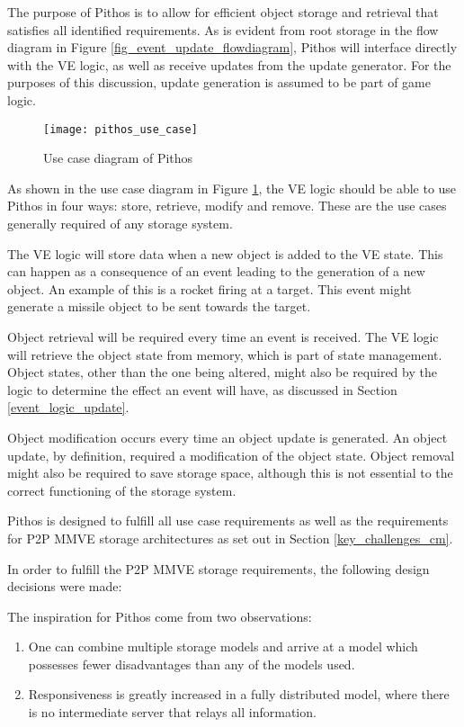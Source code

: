 The purpose of Pithos is to allow for efficient object storage and retrieval that satisfies all identified requirements. As is evident from root storage in the flow diagram in Figure \ref{fig_event_update_flowdiagram}, Pithos will interface directly with the VE logic, as well as receive updates from the update generator. For the purposes of this discussion, update generation is assumed to be part of game logic.

\begin{figure}[htbp]
 \centering
 \texttt{[image: pithos\_use\_case]}
 \caption{Use case diagram of Pithos}
 \label{fig_pithos_use_case}
\end{figure}

As shown in the use case diagram in Figure \ref{fig_pithos_use_case}, the VE logic should be able to use Pithos in four ways: store, retrieve, modify and remove. These are the use cases generally required of any storage system.

The VE logic will store data when a new object is added to the VE state. This can happen as a consequence of an event leading to the generation of a new object. An example of this is a rocket firing at a target. This event might generate a missile object to be sent towards the target.

Object retrieval will be required every time an event is received. The VE logic will retrieve the object state from memory, which is part of state management. Object states, other than the one being altered, might also be required by the logic to determine the effect an event will have, as discussed in Section \ref{event_logic_update}.

Object modification occurs every time an object update is generated. An object update, by definition, required a modification of the object state. Object removal might also be required to save storage space, although this is not essential to the correct functioning of the storage system.

Pithos is designed to fulfill all use case requirements as well as the requirements for P2P MMVE storage architectures as set out in Section \ref{key_challenges_cm}.

In order to fulfill the P2P MMVE storage requirements, the following design decisions were made:

The inspiration for Pithos come from two observations:
%
\begin{enumerate}
  \item One can combine multiple storage models and arrive at a model which possesses fewer disadvantages than any of the models used.
  \item Responsiveness is greatly increased in a fully distributed model, where there is no intermediate server that relays all information.
\end{enumerate}


